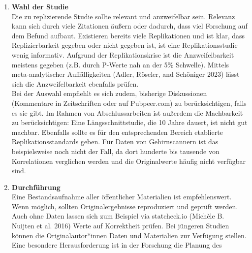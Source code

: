 \documentclass[
  letterpaper,
  DIV=11,
  numbers=noendperiod]{scrreprt}
\begin{document}
\begin{tcolorbox}[enhanced jigsaw, title=\textcolor{quarto-callout-tip-color}{\faLightbulb}\hspace{0.5em}{Kurzleitfaden für die Durchführung von Replikationsstudien}, colbacktitle=quarto-callout-tip-color!10!white, rightrule=.15mm, titlerule=0mm, left=2mm, bottomrule=.15mm, arc=.35mm, leftrule=.75mm, toprule=.15mm, opacityback=0, breakable, bottomtitle=1mm, colframe=quarto-callout-tip-color-frame, toptitle=1mm, opacitybacktitle=0.6, coltitle=black, colback=white]

\begin{enumerate}
\def\labelenumi{\arabic{enumi}.}
\item
  \textbf{Wahl der Studie}\\
  Die zu replizierende Studie sollte relevant und anzweifelbar sein.
  Relevanz kann sich durch viele Zitationen äußern oder dadurch, dass
  viel Forschung auf dem Befund aufbaut. Existieren bereits viele
  Replikationen und ist klar, dass Replizierbarkeit gegeben oder nicht
  gegeben ist, ist eine Replikationsstudie wenig informativ. Aufgrund
  der Replikationskrise ist die Anzweifelbarkeit meistens gegeben (z.B.
  durch P-Werte nah an der 5\% Schwelle). Mittels meta-analytischer
  Auffälligkeiten (Adler, Röseler, and Schöniger 2023) lässt sich die
  Anzweifelbarkeit ebenfalls prüfen.\\
  Bei der Auswahl empfiehlt es sich zudem, bisherige Diskussionen
  (Kommentare in Zeitschriften oder auf Pubpeer.com) zu berücksichtigen,
  falls es sie gibt. Im Rahmen von Abschlussarbeiten ist außerdem die
  Machbarkeit zu berücksichtigen: Eine Längsschnittstudie, die 10 Jahre
  dauert, ist nicht gut machbar. Ebenfalls sollte es für den
  entsprechenden Bereich etablierte Replikationsstandards geben. Für
  Daten von Gehirnscannern ist das beispielsweise noch nicht der Fall,
  da dort hunderte bis tausende von Korrelationen verglichen werden und
  die Originalwerte häufig nicht verfügbar sind.
\item
  \textbf{Durchführung}\\
  Eine Bestandsaufnahme aller öffentlicher Materialien ist
  empfehlenswert. Wenn möglich, sollten Originalergebnisse reproduziert
  und geprüft werden. Auch ohne Daten lassen sich zum Beispiel via
  statcheck.io (Michèle B. Nuijten et al. 2016) Werte auf Korrektheit
  prüfen. Bei jüngeren Studien können die Originalautor*innen Daten und
  Materialien zur Verfügung stellen.\\
  Eine besondere Herausforderung ist in der Forschung die Planung des

\end{enumerate}
\end{tcolorbox}
\end{document}
